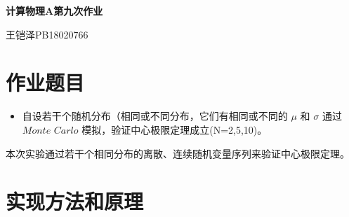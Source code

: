 \documentclass[UTF8]{ctexart}
\begin{document}
	\centering\textbf{\LARGE{计算物理A第九次作业}}
	
	
	王铠泽\qquad PB18020766
	
		
	\section{作业题目}
	
	\begin{itemize}
		\item 自设若干个随机分布（相同或不同分布，它们有相同或不同的 $\mu$ 和 $\sigma$ 通过 $Monte\,\,Carlo$ 模拟，验证中心极限定理成立(N=2,5,10)。
	\end{itemize}
		本次实验通过若干个相同分布的离散、连续随机变量序列来验证中心极限定理。
	\section{实现方法和原理}
	
\end{document}
